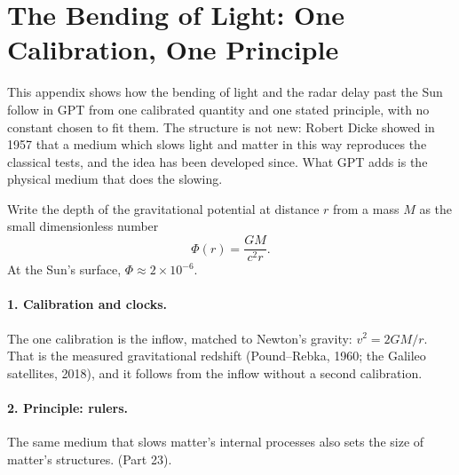\clearpage
\appendix
\renewcommand{\thesection}{1.\Alph{section}}
\section{The Bending of Light: One Calibration, One Principle}

This appendix shows how the bending of light and the radar delay past the Sun follow in GPT from one calibrated quantity and one stated principle, with no constant chosen to fit them. The structure is not new: Robert Dicke showed in 1957 that a medium which slows light and matter in this way reproduces the classical tests, and the idea has been developed since. What GPT adds is the physical medium that does the slowing.

Write the depth of the gravitational potential at distance $r$ from a mass $M$ as the small dimensionless number
\[
\Phi(r) = \frac{GM}{c^2 r}.
\]
At the Sun's surface, $\Phi \approx 2\times10^{-6}$.

\paragraph{1. Calibration and clocks.} The one calibration is the inflow, matched to Newton's gravity: $v^2 = 2GM/r$.  That is the measured gravitational redshift (Pound--Rebka, 1960; the Galileo satellites, 2018), and it follows from the inflow without a second calibration. 

\paragraph{2. Principle: rulers.} The same medium that slows matter's internal processes also sets the size of matter's structures.  (Part 23). 

